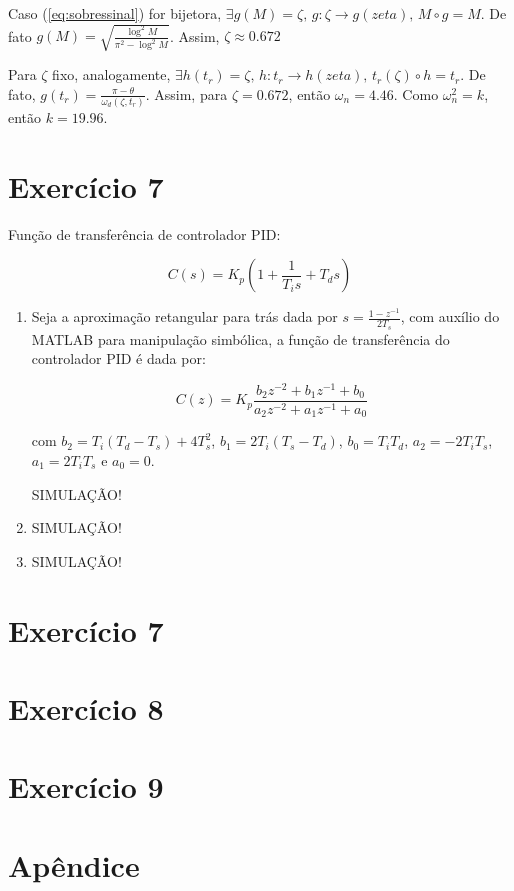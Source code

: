 \documentclass{article}
\begin{document}
Caso (\ref{eq:sobressinal}) for bijetora, $\exists g(M) = \zeta \mbox{, } g: \zeta \rightarrow g(zeta) \mbox{, } M \circ g = M$. De fato $g(M) = \sqrt{\frac{\log^2{M}}{\pi^2 - \log^2{M}}}$. Assim, $\zeta \approx 0.672$

Para $\zeta$ fixo, analogamente, $\exists h(t_r) = \zeta\mbox{, }h: t_r \rightarrow h(zeta)\mbox{, } t_r(\zeta) \circ h = t_r$. De fato, $g(t_r) = \frac{\pi - \theta}{\omega_d(\zeta, t_r)}$. Assim, para $\zeta = 0.672$, então $\omega_n = 4.46$.  Como $\omega_n^2 = k$, então $k = 19.96$.

\section*{Exercício 7}

Função de transferência de controlador PID:

\begin{equation}
C(s) = K_p\left(1 + \frac{1}{T_i s} + T_d s\right)
\end{equation}

\begin{enumerate}
	\item %
	Seja a aproximação retangular para trás dada por $s = \frac{1 - z^{-1}}{2 T_s}$, com auxílio do MATLAB para manipulação simbólica, a função de transferência do controlador PID é dada por:
	
	\begin{equation}
	C(z) = K_p \frac{b_2 z^{-2} + b_1 z^{-1} + b_0}{a_2 z^{-2} + a_1 z^{-1} + a_0}
	\end{equation}
	
	com $b_2 = T_i (T_d - T_s) + 4T_s^2$, $b_1 = 2T_i(T_s - T_d)$, $b_0 = T_i T_d$, $a_2 = -2T_i T_s$, $a_1 = 2 T_i T_s$ e $a_0 = 0$.

	SIMULAÇÃO!

	\item %
	SIMULAÇÃO!
	
	\item %
	SIMULAÇÃO!
	
\end{enumerate}

\section*{Exercício 7}

\section*{Exercício 8}

\section*{Exercício 9}

\section*{\Huge Apêndice}
\end{document}
